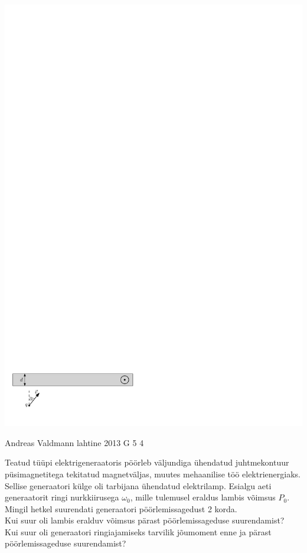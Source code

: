 \documentclass[11pt, twoside]{article}
\begin{document}
{{\begin{center}
\includegraphics[width=\linewidth]{2013-lahg-02-magnetpeegeljoonis_ipe}
\end{center}
\fi
}

{Andreas Valdmann} %
{lahtine} %
{2013} %
{G 5} %
{4} %
{
\ifStatement
Teatud tüüpi elektrigeneraatoris pöörleb väljundiga ühendatud juhtmekontuur
püsimagnetitega tekitatud magnetväljas, muutes mehaanilise töö elektrienergiaks.
Sellise generaatori külge oli tarbijana ühendatud elektrilamp. Esialgu aeti
generaatorit ringi nurkkiirusega $\omega_0$, mille tulemusel eraldus lambis
võimsus $P_0$. Mingil hetkel suurendati generaatori pöörlemissagedust 2 korda.\\
\osa Kui suur oli lambis eralduv võimsus pärast pöörlemissageduse suurendamist?\\
\osa Kui suur oli generaatori ringiajamiseks tarvilik jõumoment enne ja
pärast pöörlemissageduse suurendamist?

}}
\end{document}
